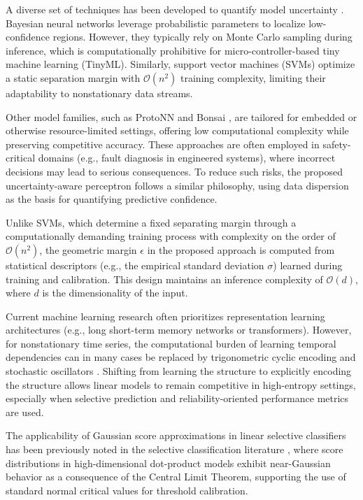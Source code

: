 \documentclass[conference]{IEEEtran}
\begin{document}
A diverse set of techniques has been developed to quantify model uncertainty \cite{b3}. Bayesian neural networks leverage probabilistic parameters to localize low-confidence regions. However, they typically rely on Monte Carlo sampling during inference, which is computationally prohibitive for micro-controller-based tiny machine learning (TinyML). Similarly, support vector machines (SVMs) optimize a static separation margin with $\mathcal{O}(n^2)$ training complexity, limiting their adaptability to nonstationary data streams.

Other model families, such as ProtoNN and Bonsai \cite{b11}, are tailored for embedded or otherwise resource-limited settings, offering low computational complexity while preserving competitive accuracy. These approaches are often employed in safety-critical domains (e.g., fault diagnosis in engineered systems), where incorrect decisions may lead to serious consequences. To reduce such risks, the proposed uncertainty-aware perceptron follows a similar philosophy, using data dispersion as the basis for quantifying predictive confidence.

Unlike SVMs, which determine a fixed separating margin through a computationally demanding training process with complexity on the order of $\mathcal{O}(n^2)$, the geometric margin $\epsilon$ in the proposed approach is computed from statistical descriptors (e.g., the empirical standard deviation $\sigma$) learned during training and calibration. This design maintains an inference complexity of $\mathcal{O}(d)$, where $d$ is the dimensionality of the input.

Current machine learning research often prioritizes representation learning architectures (e.g., long short-term memory networks or transformers). However, for nonstationary time series, the computational burden of learning temporal dependencies can in many cases be replaced by trigonometric cyclic encoding and stochastic oscillators \cite{b12}. Shifting from learning the structure to explicitly encoding the structure allows linear models to remain competitive in high-entropy settings, especially when selective prediction and reliability-oriented performance metrics are used.

The applicability of Gaussian score approximations in linear selective classifiers has been previously noted in the selective classification literature \cite{b8}, where score distributions in high-dimensional dot-product models exhibit near-Gaussian behavior as a consequence of the Central Limit Theorem, supporting the use of standard normal critical values for threshold calibration.
\end{document}
